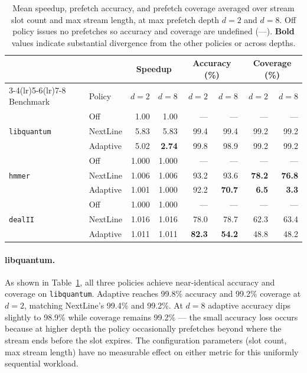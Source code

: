 \documentclass[11pt,letterpaper]{article}
\begin{document}
\begin{table}[H]
\centering
\small
\begin{tabular}{llrrrrrr}
\toprule
& & \multicolumn{2}{c}{Speedup} & \multicolumn{2}{c}{Accuracy (\%)} & \multicolumn{2}{c}{Coverage (\%)} \\
\cmidrule(lr){3-4}\cmidrule(lr){5-6}\cmidrule(lr){7-8}
Benchmark & Policy & $d{=}2$ & $d{=}8$ & $d{=}2$ & $d{=}8$ & $d{=}2$ & $d{=}8$ \\
\midrule
\multirow{3}{*}{\texttt{libquantum}}
 & Off      & 1.00  & 1.00  & ---  & ---  & ---  & ---  \\
 & NextLine & 5.83  & 5.83  & 99.4 & 99.4 & 99.2 & 99.2 \\
 & Adaptive & 5.02  & \textbf{2.74} & 99.8 & 98.9 & 99.2 & 99.2 \\
\midrule
\multirow{3}{*}{\texttt{hmmer}}
 & Off      & 1.000 & 1.000 & ---  & ---  & ---  & ---  \\
 & NextLine & 1.006 & 1.006 & 93.2 & 93.6 & \textbf{78.2} & \textbf{76.8} \\
 & Adaptive & 1.001 & 1.000 & 92.2 & \textbf{70.7} & \textbf{6.5}  & \textbf{3.3}  \\
\midrule
\multirow{3}{*}{\texttt{dealII}}
 & Off      & 1.000 & 1.000 & ---  & ---  & ---  & ---  \\
 & NextLine & 1.016 & 1.016 & 78.0 & 78.7 & 62.3 & 63.4 \\
 & Adaptive & 1.011 & 1.011 & \textbf{82.3} & \textbf{54.2} & 48.8 & 48.2 \\
\bottomrule
\end{tabular}
\caption{Mean speedup, prefetch accuracy, and prefetch coverage averaged over
stream slot count and max stream length, at max prefetch depth $d{=}2$ and
$d{=}8$. Off policy issues no prefetches so accuracy and coverage are
undefined (---). \textbf{Bold} values indicate substantial divergence from
the other policies or across depths.}
\label{tab:acc_cov_summary}
\end{table}

\paragraph{libquantum.}
As shown in Table~\ref{tab:acc_cov_summary}, all three policies achieve
near-identical accuracy and coverage on \texttt{libquantum}. Adaptive reaches
99.8\% accuracy and 99.2\% coverage at $d{=}2$, matching NextLine's 99.4\%
and 99.2\%. At $d{=}8$ adaptive accuracy dips slightly to 98.9\% while
coverage remains 99.2\% — the small accuracy loss occurs because at higher
depth the policy occasionally prefetches beyond where the stream ends before
the slot expires. The configuration parameters (slot count, max stream length)
have no measurable effect on either metric for this uniformly sequential
workload.
\end{document}
